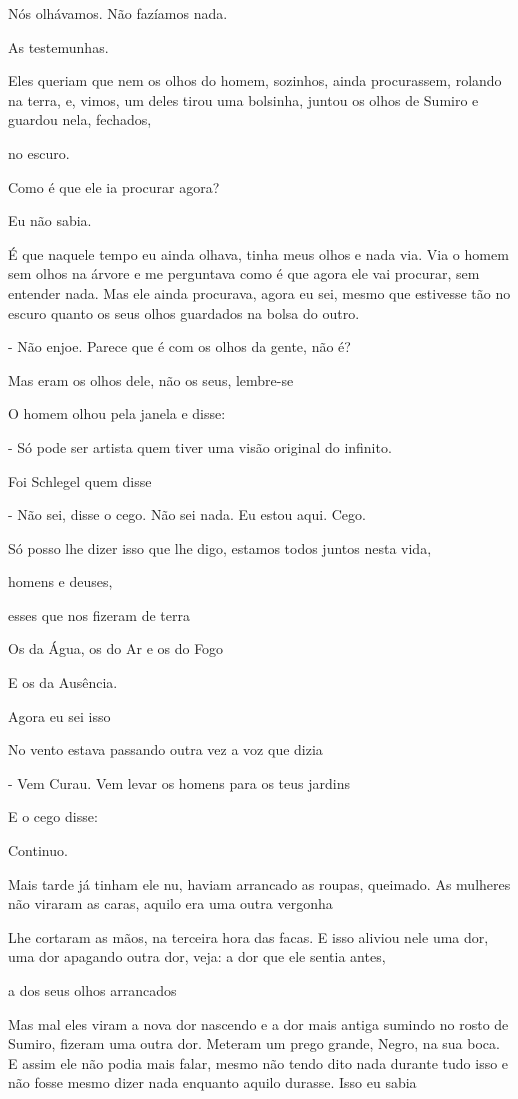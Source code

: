 Nós olhávamos. Não fazíamos nada.

As testemunhas.

Eles queriam que nem os olhos do homem, sozinhos, ainda procurassem,
rolando na terra, e, vimos, um deles tirou uma bolsinha, juntou os olhos
de Sumiro e guardou nela, fechados,

no escuro.

Como é que ele ia procurar agora?

Eu não sabia.

É que naquele tempo eu ainda olhava, tinha meus olhos e nada via. Via o
homem sem olhos na árvore e me perguntava como é que agora ele vai
procurar, sem entender nada. Mas ele ainda procurava, agora eu sei,
mesmo que estivesse tão no escuro quanto os seus olhos guardados na
bolsa do outro.

- Não enjoe. Parece que é com os olhos da gente, não é?

Mas eram os olhos dele, não os seus, lembre-se

O homem olhou pela janela e disse:

- Só pode ser artista quem tiver uma visão original do infinito.

Foi Schlegel quem disse

- Não sei, disse o cego. Não sei nada. Eu estou aqui. Cego.

Só posso lhe dizer isso que lhe digo, estamos todos juntos nesta vida,

homens e deuses,

esses que nos fizeram de terra

Os da Água, os do Ar e os do Fogo

E os da Ausência.

Agora eu sei isso

No vento estava passando outra vez a voz que dizia

- Vem Curau. Vem levar os homens para os teus jardins

E o cego disse:

Continuo.

Mais tarde já tinham ele nu, haviam arrancado as roupas, queimado. As
mulheres não viraram as caras, aquilo era uma outra vergonha

Lhe cortaram as mãos, na terceira hora das facas. E isso aliviou nele
uma dor, uma dor apagando outra dor, veja: a dor que ele sentia antes,

a dos seus olhos arrancados

Mas mal eles viram a nova dor nascendo e a dor mais antiga sumindo no
rosto de Sumiro, fizeram uma outra dor. Meteram um prego grande, Negro,
na sua boca. E assim ele não podia mais falar, mesmo não tendo dito nada
durante tudo isso e não fosse mesmo dizer nada enquanto aquilo durasse.
Isso eu sabia

